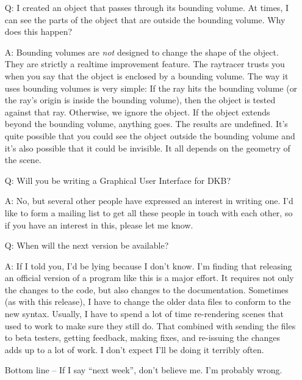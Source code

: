 \begin{itemize}
\item[Q:] I created an object that passes through its bounding
volume.
At times, I can see the parts of the object that are outside the
bounding volume.  Why does this happen?
\item[A:] Bounding volumes are {\em not} designed to change the
shape of the object.  They are strictly a realtime improvement
feature.  The raytracer trusts you when you say that the object is
enclosed by a bounding volume.  The way it uses bounding volumes is
very simple: If the ray hits the bounding volume (or the ray's origin
is inside the bounding volume), then the object is tested against that
ray.  Otherwise, we ignore the object.  If the object extends beyond
the bounding volume, anything goes.  The results are undefined.  It's
quite possible that you could see the object outside the bounding
volume and it's also possible that it could be invisible.  It all
depends on the geometry of the scene.

\item[Q:] Will you be writing a Graphical User Interface for DKB?
\item[A:] No, but several other people have expressed an interest in writing
one.  I'd like to form a mailing list to get all these people in touch
with each other, so if you have an interest in this, please let me
know.

\item[Q:] When will the next version be available?
\item[A:] If I told you, I'd be lying because I don't know.  I'm finding that
releasing an official version of a program like this is a major
effort.  It requires not only the changes to the code, but also
changes to the documentation.  Sometimes (as with this release), I
have to change the older data files to conform to the new syntax.
Usually, I have to spend a lot of time re-rendering scenes that used
to work to make sure they still do.  That combined with sending the
files to beta testers, getting feedback, making fixes, and re-issuing
the changes adds up to a lot of work.  I don't expect I'll be doing
it terribly often.

Bottom line -- If I say ``next week'', don't believe me.  I'm probably
wrong.
\end{itemize}
